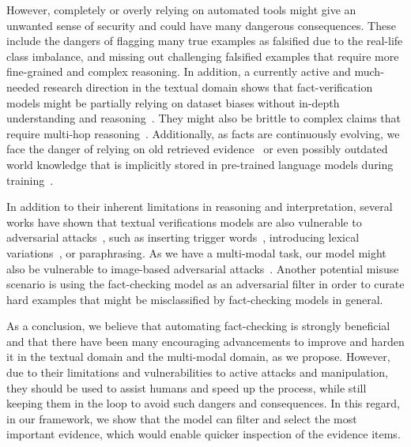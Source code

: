However, completely or overly relying on automated tools might give an unwanted sense of security and could have many dangerous consequences. These include the dangers of flagging many true examples as falsified due to the real-life class imbalance, and missing out challenging falsified examples that require more fine-grained and complex reasoning. In addition, a currently active and much-needed research direction in the textual domain shows that fact-verification models might be partially relying on dataset biases without in-depth understanding and reasoning~\cite{schuster2019towards}. They might also be brittle to complex claims that require multi-hop reasoning~\cite{hidey2020deseption}. Additionally, as facts are continuously evolving, we face the danger of relying on old retrieved evidence~\cite{schuster2021get} or even possibly outdated world knowledge that is implicitly stored in pre-trained language models during training~\cite{schuster2019towards}.

In addition to their inherent limitations in reasoning and interpretation, several works have shown that textual verifications models are also vulnerable to adversarial attacks~\cite{thorne2019evaluating}, such as inserting trigger words~\cite{atanasova2020generating}, introducing lexical variations~\cite{hidey2020deseption}, or paraphrasing\cite{thorne2019evaluating}. As we have a multi-modal task, our model might also be vulnerable to image-based adversarial attacks~\cite{goodfellow2014explaining}. %
Another potential misuse scenario is using the fact-checking model as an adversarial filter in order to curate hard examples that might be misclassified by fact-checking models in general. 

As a conclusion, we believe that automating fact-checking is strongly beneficial and that there have been many encouraging advancements to improve and harden it in the textual domain and the multi-modal domain, as we propose. However, due to their limitations and vulnerabilities to active attacks and manipulation, they should be used to assist humans and speed up the process, while still keeping them in the loop to avoid such dangers and consequences. In this regard, in our framework, we show that the model can filter and select the most important evidence, which would enable quicker inspection of the evidence items. 




